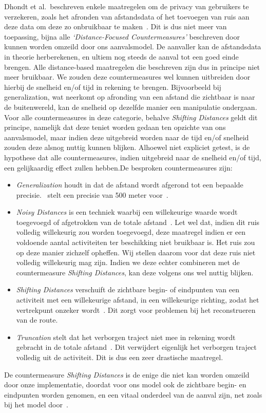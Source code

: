 Dhondt et al.\ beschreven enkele maatregelen om de privacy van gebruikers te
verzekeren, zoals het afronden van afstandsdata of het toevoegen van ruis aan
deze data om deze zo onbruikbaar te maken~\cite{Dhondt}. Dit is dus niet meer
van toepassing, bijna alle \textit{`Distance-Focused Countermeasures'}
beschreven door~\citeauthor{Dhondt} kunnen worden omzeild door ons
aanvalsmodel. De aanvaller kan de afstandsdata in theorie herberekenen, en
ultiem nog steeds de aanval tot een goed einde brengen. Alle distance-based
maatregelen die \citeauthor{Dhondt} beschreven zijn dus in principe niet meer
bruikbaar. We zouden deze countermeasures wel kunnen uitbreiden door hierbij de
snelheid en/of tijd in rekening te brengen. Bijvoorbeeld bij generalization,
wat neerkomt op afronding van een afstand die zichtbaar is naar de
buitenwereld, kan de snelheid op dezelfde manier een manipulatie ondergaan.
Voor alle countermeasures in deze categorie, behalve \textit{Shifting
      Distances} geldt dit principe, namelijk dat deze teniet worden gedaan ten
opzichte van ons aanvalsmodel, maar indien deze uitgebreid worden naar de tijd
en/of snelheid zouden deze alsnog nuttig kunnen blijken. Alhoewel niet
expliciet getest, is de hypothese dat alle countermeasures, indien uitgebreid
naar de snelheid en/of tijd, een gelijkaardig effect zullen hebben.De besproken
countermeasures zijn:
\begin{itemize}
      \item \textit{Generalization} houdt in dat de afstand wordt afgerond tot een bepaalde
            precisie.~\citeauthor{Dhondt} stelt een precisie van 500 meter
            voor~\cite{Dhondt}.
      \item \textit{Noisy Distances} is een techniek waarbij een willekeurige waarde wordt
            toegevoegd of afgetrokken van de totale afstand~\cite{Dhondt}. Let wel dat, indien dit ruis volledig willekeurig zou worden toegevoegd, deze maatregel indien er een
            voldoende aantal activiteiten ter beschikking niet bruikbaar is. Het ruis zou op deze manier zichzelf opheffen. Wij stellen daarom voor dat deze ruis niet volledig willekeurig mag zijn.
            Indien we deze echter combineren met de countermeasure \textit{Shifting Distances}, kan deze volgens ons wel nuttig blijken.
      \item \textit{Shifting Distances} verschuift de zichtbare begin- of eindpunten van een activiteit met een willekeurige afstand, in een willekeurige richting,
            zodat het vertrekpunt onzeker wordt~\cite{Dhondt}. Dit zorgt voor problemen bij het reconstrueren van de route.
      \item \textit{Truncation} stelt dat het verborgen traject niet mee in rekening wordt gebracht in de
            totale afstand~\cite{Dhondt}. Dit verwijdert eigenlijk het verborgen traject volledig uit de activiteit. Dit is dus een zeer drastische maatregel.
\end{itemize}
De countermeasure \textit{Shifting Distances} is de enige die niet kan worden
omzeild door onze implementatie, doordat voor ons model ook de
zichtbare begin- en eindpunten worden genomen, en een vitaal onderdeel van de
aanval zijn, net zoals bij het model door~\citeauthor{Dhondt}.

